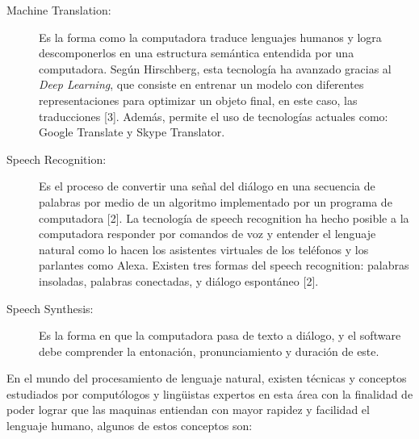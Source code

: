                 \begin{description}
                    
                    \item[Machine Translation:]Es la forma como la computadora traduce lenguajes humanos y logra descomponerlos en una estructura semántica entendida por una computadora. Según Hirschberg, esta tecnología ha avanzado gracias al \textit{Deep Learning}, que consiste en entrenar un modelo con diferentes representaciones para optimizar un objeto final, en este caso, las traducciones [3]. Además, permite el uso de tecnologías actuales como: Google Translate y Skype Translator.
                    
                    
                    \item[Speech Recognition:] Es el proceso de convertir una señal del diálogo en una secuencia de palabras por medio de un algoritmo implementado por un programa de computadora [2]. La tecnología de speech recognition ha hecho posible a la computadora responder por comandos de voz y entender el lenguaje natural como lo hacen los asistentes virtuales de los teléfonos y los parlantes como Alexa. Existen tres formas del speech recognition: palabras insoladas, palabras conectadas, y diálogo espontáneo [2].
                    
                    \item[Speech Synthesis:] Es la forma en que la computadora pasa de texto a diálogo, y el software debe comprender la entonación, pronunciamiento y duración de este.
                \end{description}
            
            En el mundo del procesamiento de lenguaje natural, existen técnicas y conceptos estudiados por computólogos y lingüistas expertos en esta área con la finalidad de poder lograr que las maquinas entiendan con mayor rapidez y facilidad el lenguaje humano, algunos de estos conceptos son:
            
